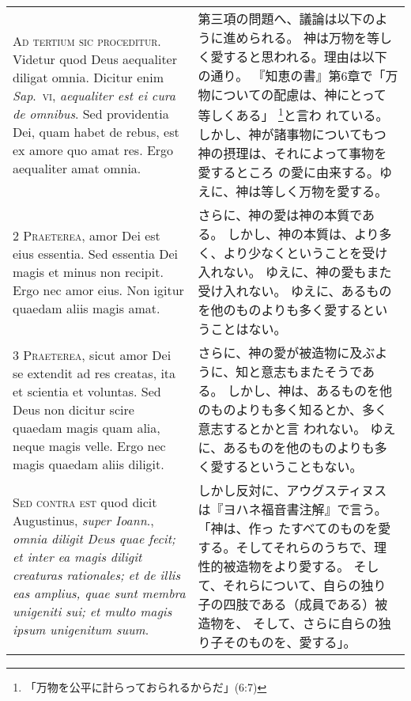 \documentclass[10pt]{jsarticle} %
\begin{document}
\begin{longtable}{p{21em}p{21em}}

{\Huge A}{\scshape d tertium sic proceditur}. Videtur quod
Deus aequaliter diligat omnia. Dicitur enim {\itshape Sap}.~{\scshape vi}, {\itshape aequaliter est ei
cura de omnibus}. Sed providentia Dei, quam habet de rebus, est ex amore
quo amat res. Ergo aequaliter amat omnia.


&

第三項の問題へ、議論は以下のように進められる。
神は万物を等しく愛すると思われる。理由は以下の通り。
『知恵の書』第6章で「万物についての配慮は、神にとって等しくある」
 \footnote{「万物を公平に計らっておられるからだ」(6:7)}と言わ
 れている。
しかし、神が諸事物についてもつ神の摂理は、それによって事物を愛するところ
 の愛に由来する。ゆえに、神は等しく万物を愛する。



\\


{\scshape 2 Praeterea}, amor Dei est eius essentia. Sed
essentia Dei magis et minus non recipit. Ergo nec amor eius. Non igitur
quaedam aliis magis amat.


&

さらに、神の愛は神の本質である。
しかし、神の本質は、より多く、より少なくということを受け入れない。
ゆえに、神の愛もまた受け入れない。
ゆえに、あるものを他のものよりも多く愛するということはない。


\\


{\scshape 3 Praeterea}, sicut amor Dei se extendit ad
res creatas, ita et scientia et voluntas. Sed Deus non dicitur scire
quaedam magis quam alia, neque magis velle. Ergo nec magis quaedam aliis
diligit.


&

さらに、神の愛が被造物に及ぶように、知と意志もまたそうである。
しかし、神は、あるものを他のものよりも多く知るとか、多く意志するとかと言
 われない。
ゆえに、あるものを他のものよりも多く愛するということもない。



\\


{\scshape Sed contra est} quod dicit Augustinus, {\itshape super
Ioann}., {\itshape omnia diligit Deus quae fecit; et inter ea magis diligit
creaturas rationales; et de illis eas amplius, quae sunt membra
unigeniti sui; et multo magis ipsum unigenitum suum}.


&

しかし反対に、アウグスティヌスは『ヨハネ福音書注解』で言う。「神は、作っ
 たすべてのものを愛する。そしてそれらのうちで、理性的被造物をより愛する。
 そして、それらについて、自らの独り子の四肢である（成員である）被造物を、
 そして、さらに自らの独り子そのものを、愛する」。



\end{longtable}
\end{document}
